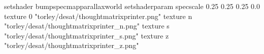 setshader bumpspecmapparallaxworld
setshaderparam specscale 0.25 0.25 0.25 0.0
texture 0 "torley/desat/thoughtmatrixprinter.png"
texture n "torley/desat/thoughtmatrixprinter_n.png"
texture s "torley/desat/thoughtmatrixprinter_s.png"
texture z "torley/desat/thoughtmatrixprinter_z.png"

